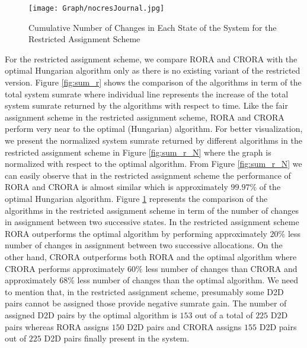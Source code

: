 \documentclass[times]{dacauth}
\begin{document}
\begin{figure}[t]
	{ %
		\setlength{\fboxsep}{1.5pt}%
		\setlength{\fboxrule}{1.5pt}%
		\centering
		\texttt{[image: Graph/nocresJournal.jpg]}
		\vspace{-0.2cm}
		\caption{Cumulative Number of Changes in Each State of the System for the Restricted Assignment Scheme} \label{fig:noc_r}
		\vspace{-.5cm}
	}
\end{figure}


\noindent
For the restricted assignment scheme, we compare RORA and CRORA with the optimal Hungarian algorithm only as there is no existing variant of the restricted version. Figure \ref{fig:sum_r} shows the comparison of the algorithms in term of the total system sumrate where individual line represents the increase of the total system sumrate returned by the algorithms with respect to time. Like the fair assignment scheme in the restricted assignment scheme, RORA and CRORA perform very near to the optimal (Hungarian) algorithm. For better visualization, we present the normalized system sumrate returned by different algorithms in the restricted assignment scheme in Figure \ref{fig:sum_r_N} where the graph is normalized with respect to the optimal algorithm. From Figure \ref{fig:sum_r_N} we can easily observe that in the restricted assignment scheme the performance of RORA and CRORA is almost similar which is approximately $99.97\%$ of the optimal Hungarian algorithm. Figure  \ref{fig:noc_r} represents the comparison of the algorithms in the restricted assignment scheme in term of the number of changes in assignment between two successive states. In the restricted assignment scheme RORA outperforms the optimal algorithm by performing approximately $20\%$ less number of changes in assignment between two successive allocations. On the other hand,  CRORA outperforms both RORA and the optimal algorithm where CRORA performs  approximately $60\%$ less number of changes than CRORA and approximately 68\% less number of changes than the optimal algorithm. We need to mention that, in the restricted assignment scheme, presumably some D2D pairs cannot be assigned those provide negative sumrate gain. The number of assigned D2D pairs by the optimal algorithm is $153$ out of a total of $225$ D2D pairs whereas RORA assigns $150$ D2D pairs and CRORA assigns $155$ D2D pairs out of $225$ D2D pairs finally present in the system.  
\end{document}
